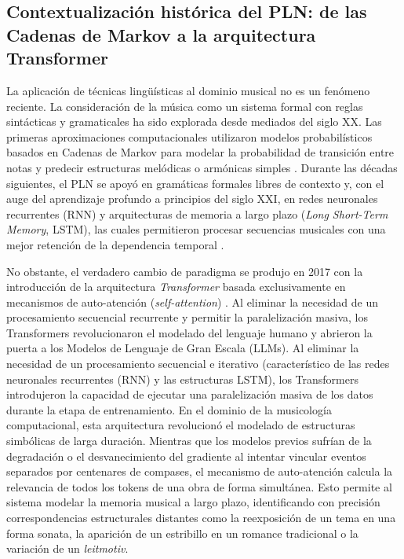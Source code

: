 \subsection{Contextualización histórica del PLN: de las Cadenas de Markov a la arquitectura Transformer}
La aplicación de técnicas lingüísticas al dominio musical no es un fenómeno reciente. La consideración de la música como un sistema formal con reglas sintácticas y gramaticales ha sido explorada desde mediados del siglo XX. Las primeras aproximaciones computacionales utilizaron modelos probabilísticos basados en Cadenas de Markov para modelar la probabilidad de transición entre notas y predecir estructuras melódicas o armónicas simples \citep{conklin1995multiple}. Durante las décadas siguientes, el PLN se apoyó en gramáticas formales libres de contexto y, con el auge del aprendizaje profundo a principios del siglo XXI, en redes neuronales recurrentes (RNN) y arquitecturas de memoria a largo plazo (\textit{Long Short-Term Memory}, LSTM), las cuales permitieron procesar secuencias musicales con una mejor retención de la dependencia temporal \citep{hochreiter1997long, mangal2019lstm}.

No obstante, el verdadero cambio de paradigma se produjo en 2017 con la introducción de la arquitectura \textit{Transformer} basada exclusivamente en mecanismos de auto-atención (\textit{self-attention}) \citep{vaswani2017attention}. Al eliminar la necesidad de un procesamiento secuencial recurrente y permitir la paralelización masiva, los Transformers revolucionaron el modelado del lenguaje humano y abrieron la puerta a los Modelos de Lenguaje de Gran Escala (LLMs). Al eliminar la necesidad de un procesamiento secuencial e iterativo (característico de las redes neuronales recurrentes (RNN) y las estructuras LSTM), los Transformers introdujeron la capacidad de ejecutar una paralelización masiva de los datos durante la etapa de entrenamiento. En el dominio de la musicología computacional, esta arquitectura revolucionó el modelado de estructuras simbólicas de larga duración. Mientras que los modelos previos sufrían de la degradación o el desvanecimiento del gradiente al intentar vincular eventos separados por centenares de compases, el mecanismo de auto-atención calcula la relevancia de todos los tokens de una obra de forma simultánea. Esto permite al sistema modelar la memoria musical a largo plazo, identificando con precisión correspondencias estructurales distantes como la reexposición de un tema en una forma sonata, la aparición de un estribillo en un romance tradicional o la variación de un \textit{leitmotiv}.

